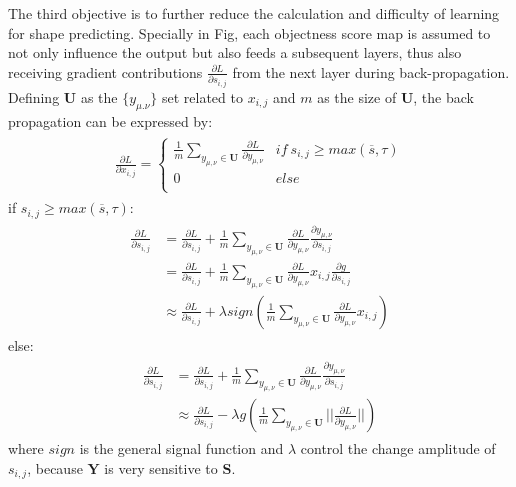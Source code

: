 \documentclass[10pt,twocolumn,letterpaper]{article}
\begin{document}
The third objective is to further reduce the calculation and difficulty of learning for shape predicting.
Specially in Fig, each objectness score map is assumed to not only influence the output but also feeds a subsequent layers, thus also receiving gradient contributions $\frac{\partial L}{\partial s_{i,j}}$ from the next layer during back-propagation.
Defining $\mathbf{U}$ as the $\{y_{\mu.\nu}\}$ set related to $x_{i,j}$ and $m$ as the size of $\mathbf{U}$, the back propagation can be expressed by:
\begin{eqnarray}\label{bpx}
\begin{aligned}
\frac{\partial L}{\partial x_{i,j}}=\left\{\begin{array}{cc}
\frac{1}{m}\sum\limits_{y_{\mu,\nu}\in\mathbf{U}}\frac{\partial L}{\partial y_{\mu,\nu}} & if~s_{i,j}\geq max(\overline{s},\tau) \\
0& else\\
\end{array}\right.
\end{aligned}
\end{eqnarray}
if $s_{i,j}\geq max(\overline{s},\tau)$:
\begin{eqnarray}\label{bps1}
\begin{aligned}
\frac{\partial L}{\partial s_{i,j}}&=\frac{\partial L}{\partial s_{i,j}}+\frac{1}{m}\sum_{y_{\mu,\nu}\in\mathbf{U}}\frac{\partial L}{\partial y_{\mu,\nu}}\frac{\partial y_{\mu,\nu}}{\partial s_{i,j}}\\
&=\frac{\partial L}{\partial s_{i,j}}+\frac{1}{m}\sum_{y_{\mu,\nu}\in\mathbf{U}}\frac{\partial L}{\partial y_{\mu,\nu}}x_{i,j}\frac{\partial g}{\partial s_{i,j}}\\
&\approx\frac{\partial L}{\partial s_{i,j}}+\lambda sign(\frac{1}{m}\sum_{y_{\mu,\nu}\in\mathbf{U}}\frac{\partial L}{\partial y_{\mu,\nu}}x_{i,j})
\end{aligned}
\end{eqnarray}
else:
\begin{eqnarray}\label{bps2}
\begin{aligned}
\frac{\partial L}{\partial s_{i,j}}&=\frac{\partial L}{\partial s_{i,j}}+\frac{1}{m}\sum_{y_{\mu,\nu}\in\mathbf{U}}\frac{\partial L}{\partial y_{\mu,\nu}}\frac{\partial y_{\mu,\nu}}{\partial s_{i,j}}\\
&\approx\frac{\partial L}{\partial s_{i,j}}-\lambda g(\frac{1}{m}\sum_{y_{\mu,\nu}\in\mathbf{U}}||\frac{\partial L}{\partial y_{\mu,\nu}}||)
\end{aligned}
\end{eqnarray}
where $sign$ is the general signal function and $\lambda$ control the change amplitude of $s_{i,j}$, because $\mathbf{Y}$ is very sensitive to $\mathbf{S}$.
\end{document}
